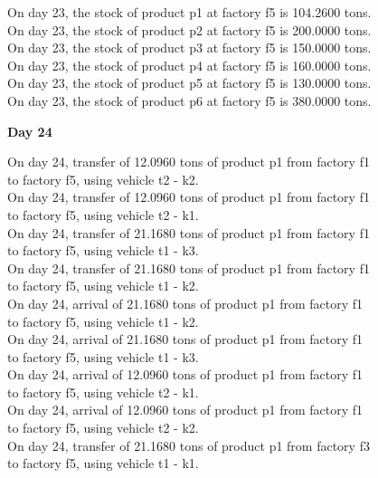 \begin{table}[H]
\begin{multicols}{2}
\begin{tabbing}
On day 23, the stock of product p1 at factory f5 is 104.2600 tons. \\
On day 23, the stock of product p2 at factory f5 is 200.0000 tons. \\
On day 23, the stock of product p3 at factory f5 is 150.0000 tons. \\
On day 23, the stock of product p4 at factory f5 is 160.0000 tons. \\
On day 23, the stock of product p5 at factory f5 is 130.0000 tons. \\
On day 23, the stock of product p6 at factory f5 is 380.0000 tons. \\
\end{tabbing} \vspace{-2.0em}
\textbf{Day 24}
\vspace{-1.6em}
\begin{tabbing}
On day 24, transfer of 12.0960 tons of product p1 from factory f1 \\ to factory f5, using vehicle t2 - k2. \\
On day 24, transfer of 12.0960 tons of product p1 from factory f1 \\ to factory f5, using vehicle t2 - k1. \\
On day 24, transfer of 21.1680 tons of product p1 from factory f1 \\ to factory f5, using vehicle t1 - k3. \\
On day 24, transfer of 21.1680 tons of product p1 from factory f1 \\ to factory f5, using vehicle t1 - k2. \\
On day 24, arrival of 21.1680 tons of product p1 from factory f1 \\ to factory f5, using vehicle t1 - k2. \\
On day 24, arrival of 21.1680 tons of product p1 from factory f1 \\ to factory f5, using vehicle t1 - k3. \\
On day 24, arrival of 12.0960 tons of product p1 from factory f1 \\ to factory f5, using vehicle t2 - k1. \\
On day 24, arrival of 12.0960 tons of product p1 from factory f1 \\ to factory f5, using vehicle t2 - k2. \\
On day 24, transfer of 21.1680 tons of product p1 from factory f3 \\ to factory f5, using vehicle t1 - k1. \\

\end{tabbing}
\end{multicols}
\end{table}
